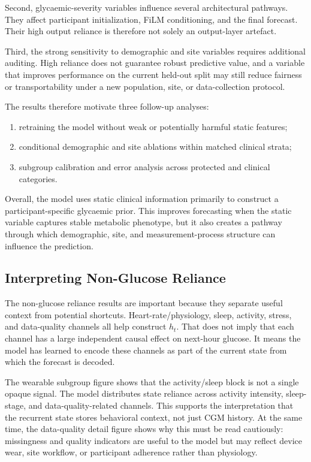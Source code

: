 Second, glycaemic-severity variables influence several architectural pathways.
They affect participant initialization, FiLM conditioning, and the final
forecast. Their high output reliance is therefore not solely an output-layer
artefact.

Third, the strong sensitivity to demographic and site variables requires
additional auditing. High reliance does not guarantee robust predictive value,
and a variable that improves performance on the current held-out split may
still reduce fairness or transportability under a new population, site, or
data-collection protocol.

The results therefore motivate three follow-up analyses:

\begin{enumerate}
    \item retraining the model without weak or potentially harmful static
    features;
    \item conditional demographic and site ablations within matched clinical
    strata;
    \item subgroup calibration and error analysis across protected and clinical
    categories.
\end{enumerate}

Overall, the model uses static clinical information primarily to construct a
participant-specific glycaemic prior. This improves forecasting when the static
variable captures stable metabolic phenotype, but it also creates a pathway
through which demographic, site, and measurement-process structure can
influence the prediction.


\subsection{Interpreting Non-Glucose Reliance}
\label{subsec:interp_non_glucose}

The non-glucose reliance results are important because they separate useful
context from potential shortcuts.
Heart-rate/physiology, sleep, activity, stress, and data-quality channels all
help construct $h_t$.
That does not imply that each channel has a large independent causal effect on
next-hour glucose.
It means the model has learned to encode these channels as part of the current
state from which the forecast is decoded.

The wearable subgroup figure shows that the activity/sleep block is not a
single opaque signal.
The model distributes state reliance across activity intensity, sleep-stage,
and data-quality-related channels.
This supports the interpretation that the recurrent state stores behavioral
context, not just CGM history.
At the same time, the data-quality detail figure shows why this must be read
cautiously: missingness and quality indicators are useful to the model but may
reflect device wear, site workflow, or participant adherence rather than
physiology.

